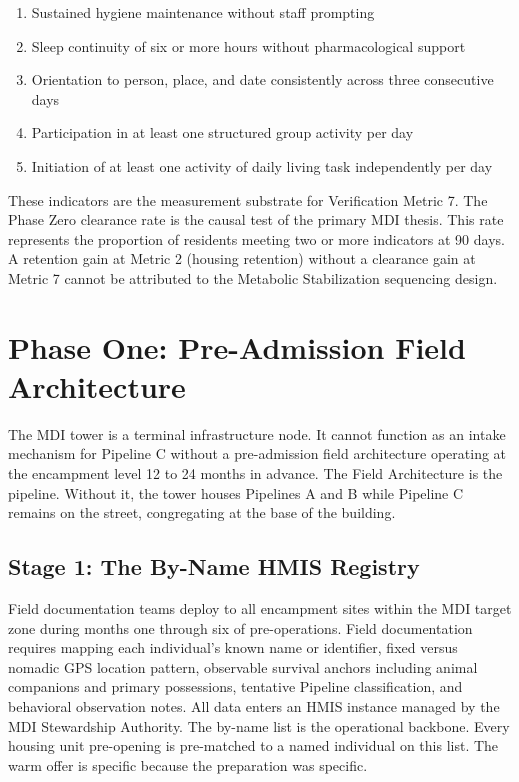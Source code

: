 \documentclass[12pt, letterpaper]{article}
\begin{document}
\begin{enumerate}[nosep, leftmargin=2.5em]
  \item Sustained hygiene maintenance without staff prompting
  \item Sleep continuity of six or more hours without pharmacological support
  \item Orientation to person, place, and date consistently across three consecutive days
  \item Participation in at least one structured group activity per day
  \item Initiation of at least one activity of daily living task independently per day
\end{enumerate}

These indicators are the measurement substrate for Verification Metric 7. The Phase Zero clearance rate is the causal test of the primary MDI thesis. This rate represents the proportion of residents meeting two or more indicators at 90 days. A retention gain at Metric 2 (housing retention) without a clearance gain at Metric 7 cannot be attributed to the Metabolic Stabilization sequencing design.

\clearpage
\section{Phase One: Pre-Admission Field Architecture}

The MDI tower is a terminal infrastructure node. It cannot function as an intake mechanism for Pipeline C without a pre-admission field architecture operating at the encampment level 12 to 24 months in advance. The Field Architecture is the pipeline. Without it, the tower houses Pipelines A and B while Pipeline C remains on the street, congregating at the base of the building.

\subsection{Stage 1: The By-Name HMIS Registry}

Field documentation teams deploy to all encampment sites within the MDI target zone during months one through six of pre-operations. Field documentation requires mapping each individual's known name or identifier, fixed versus nomadic GPS location pattern, observable survival anchors including animal companions and primary possessions, tentative Pipeline classification, and behavioral observation notes. All data enters an HMIS instance managed by the MDI Stewardship Authority. The by-name list is the operational backbone. Every housing unit pre-opening is pre-matched to a named individual on this list. The warm offer is specific because the preparation was specific.
\end{document}
